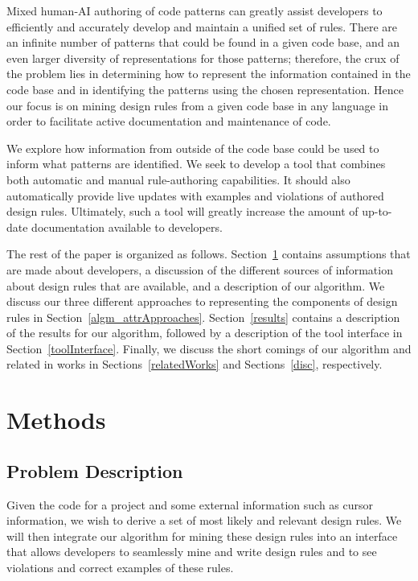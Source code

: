 \documentclass[12pt]{article}
\begin{document}
Mixed human-AI authoring of code patterns can greatly assist developers to efficiently and accurately develop and maintain a unified set of rules. There are an infinite number of patterns that could be found in a given code base, and an even larger diversity of representations for those patterns; therefore, the crux of the problem lies in determining how to represent the information contained in the code base and in identifying the patterns using the chosen representation. Hence our focus is on mining design rules from a given code base in any language in order to facilitate active documentation and maintenance of code.

We explore how information from outside of the code base could be used to inform what patterns are identified. We seek to develop a tool that combines both automatic and manual rule-authoring capabilities. It should also automatically provide live updates with examples and violations of authored design rules. Ultimately, such a tool will greatly increase the amount of up-to-date documentation available to developers.

The rest of the paper is organized as follows. Section~\ref{methods} contains assumptions that are made about developers, a discussion of the different sources of information about design rules that are available, and a description of our algorithm. We discuss our three different approaches to representing the components of design rules in Section~\ref{algm_attrApproaches}. Section~\ref{results} contains a description of the results for our algorithm, followed by a description of the tool interface in Section~\ref{toolInterface}. Finally, we discuss the short comings of our algorithm and related in works in Sections~\ref{relatedWorks} and Sections~\ref{disc}, respectively.
 
 
 \clearpage


\section{Methods}\label{methods}

\subsection{Problem Description} \label{probDesc}

Given the code for a project and some external information such as cursor information, we wish to derive a set of most likely and relevant design rules. We will then integrate our algorithm for mining these design rules into an interface that allows developers to seamlessly mine and write design rules and to see violations and correct examples of these rules. 
\end{document}
